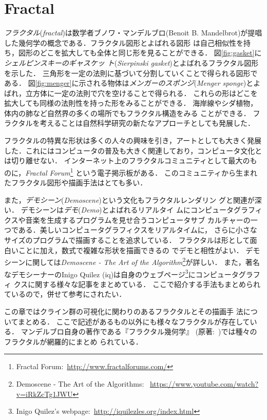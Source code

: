 
\section{Fractal}

\emph{フラクタル}(\textit{fractal})は数学者ブノワ・マンデルブロ(Benoit
B. Mandelbrot)が提唱した幾何学の概念である．フラクタル図形とよばれる図形
は自己相似性を持ち，図形のどこを拡大しても全体と同じ形を見ることができる．
図\ref{fig:gasket}に\emph{シェルピンスキーのギャスケッ
ト}(\textit{Sierpinski gasket})とよばれるフラクタル図形を示した．
三角形を一定の法則に基づいて分割していくことで得られる図形である．
図\ref{fig:menger}に示される物体は\emph{メンガーのスポンジ}(\textit{Menger
sponge})とよばれ，立方体に一定の法則で穴を空けることで得られる．
これらの形はどこを拡大しても同様の法則性を持った形をみることができる．
海岸線やシダ植物，体内の肺など自然界の多くの場所でもフラクタル構造をみる
ことができる．
フラクタルを考えることは自然科学研究の新たなアプローチとしても発展した．

フラクタルの特異な形状は多くの人々の興味を引き，アートとしても大きく発展
した．これにはコンピュータの普及も大きく関連しており，コンピュータ文化と
は切り離せない．
インターネット上のフラクタルコミュニティとして最大のものに，\textit{Fractal
Forum}\footnote{Fractal Forum:~\url{http://www.fractalforums.com/}}
という電子掲示板がある．
このコミュニティから生まれたフラクタル図形や描画手法はとても多い．

また，\emph{デモシーン}(\textit{Demoscene})という文化もフラクタルレンダリン
グと関連が深い．
デモシーンは\emph{デモ}(\textit{Demo})とよばれるリアルタイ
ムにコンピュータグラフィクスや音楽を生成するプログラムを見せ合うコンピュータサブ
カルチャーの一つである．美しいコンピュータグラフィクスをリアルタイムに，
さらに小さなサイズのプログラムで描画することを追求している．
フラクタルは形として面白いことに加え，数式で複雑な形状を描画できるの
でデモと相性がよい．
デモシーンに関しては\textit{Demoscene - The
Art of the Algorithm}\footnote{Demoscene - The Art of the Algorithms:
~\url{https://www.youtube.com/watch?v=iRkZcTg1JWU}}が詳しい．
また，著名なデモシーナーのInigo Quilez (iq)は自身のウェブページ\footnote{Inigo
Quilez's webpage:~\url{http://iquilezles.org/index.html}}にコンピュータグラフィ
クスに関する様々な記事をまとめている．
ここで紹介する手法もまとめられているので，併せて参考にされたい．

この章ではクライン群の可視化に関わりのあるフラクタルとその描画手
法についてまとめる．
ここで記述があるもの以外にも様々なフラクタルが存在している．
マンデルブロ自身の著作である『フラクタル幾何学』
\cite{mandelbrot-ja-201102-1}
\cite{mandelbrot-ja-201102-2}
(原著:~\cite{mandelbrot1983fractal})では種々のフラクタルが網羅的にまとめ
られている．

